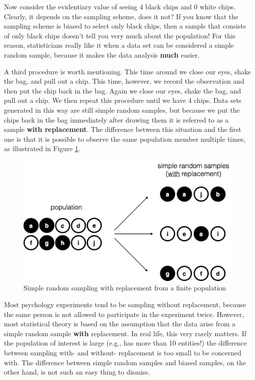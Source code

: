 \documentclass[
]{book}
\begin{document}
Now consider the evidentiary value of seeing 4 black chips and 0 white chips. Clearly, it depends on the sampling scheme, does it not? If you know that the sampling scheme is biased to select only black chips, then a sample that consists of only black chips doesn't tell you very much about the population! For this reason, statisticians really like it when a data set can be considered a simple random sample, because it makes the data analysis \textbf{much} easier.

A third procedure is worth mentioning. This time around we close our eyes, shake the bag, and pull out a chip. This time, however, we record the observation and then put the chip back in the bag. Again we close our eyes, shake the bag, and pull out a chip. We then repeat this procedure until we have 4 chips. Data sets generated in this way are still simple random samples, but because we put the chips back in the bag immediately after drawing them it is referred to as a sample \textbf{with replacement}. The difference between this situation and the first one is that it is possible to observe the same population member multiple times, as illustrated in Figure \ref{fig:srs2}.

\begin{figure}
\centering
\includegraphics{navarro_img/estimation/srs2.pdf}
\caption{\label{fig:srs2}Simple random sampling with replacement from a finite population}
\end{figure}

Most psychology experiments tend to be sampling without replacement, because the same person is not allowed to participate in the experiment twice. However, most statistical theory is based on the assumption that the data arise from a simple random sample \textbf{with} replacement. In real life, this very rarely matters. If the population of interest is large (e.g., has more than 10 entities!) the difference between sampling with- and without- replacement is too small to be concerned with. The difference between simple random samples and biased samples, on the other hand, is not such an easy thing to dismiss.
\end{document}
